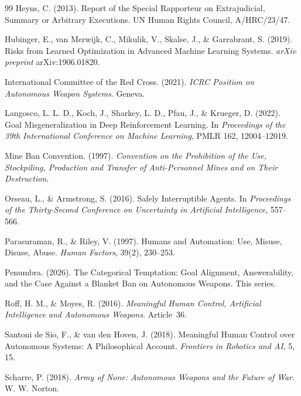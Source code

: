 \documentclass[11pt]{article}
\begin{document}
\begin{thebibliography}{99}
Heyns, C. (2013). Report of the Special Rapporteur on Extrajudicial, Summary or Arbitrary Executions. UN Human Rights Council, A/HRC/23/47.

Hubinger, E., van Merwijk, C., Mikulik, V., Skalse, J., \& Garrabrant, S. (2019). Risks from Learned Optimization in Advanced Machine Learning Systems. \textit{arXiv preprint} arXiv:1906.01820.

International Committee of the Red Cross. (2021). \textit{ICRC Position on Autonomous Weapon Systems}. Geneva.

Langosco, L. L. D., Koch, J., Sharkey, L. D., Pfau, J., \& Krueger, D. (2022). Goal Misgeneralization in Deep Reinforcement Learning. In \textit{Proceedings of the 39th International Conference on Machine Learning}, PMLR 162, 12004--12019.

Mine Ban Convention. (1997). \textit{Convention on the Prohibition of the Use, Stockpiling, Production and Transfer of Anti-Personnel Mines and on Their Destruction}.

Orseau, L., \& Armstrong, S. (2016). Safely Interruptible Agents. In \textit{Proceedings of the Thirty-Second Conference on Uncertainty in Artificial Intelligence}, 557--566.

Parasuraman, R., \& Riley, V. (1997). Humans and Automation: Use, Misuse, Disuse, Abuse. \textit{Human Factors}, 39(2), 230--253.

Penumbra. (2026). The Categorical Temptation: Goal Alignment, Answerability, and the Case Against a Blanket Ban on Autonomous Weapons. This series.

Roff, H. M., \& Moyes, R. (2016). \textit{Meaningful Human Control, Artificial Intelligence and Autonomous Weapons}. Article~36.

Santoni de Sio, F., \& van den Hoven, J. (2018). Meaningful Human Control over Autonomous Systems: A Philosophical Account. \textit{Frontiers in Robotics and AI}, 5, 15.

Scharre, P. (2018). \textit{Army of None: Autonomous Weapons and the Future of War}. W. W. Norton.


\end{thebibliography}
\end{document}
